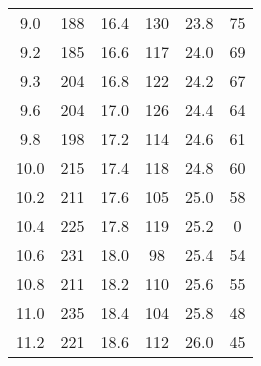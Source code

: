 \begin{table}
\begin{tabular}{S S S S S S }
9.0  & 188  & 16.4  & 130  & 23.8  & 75\\ 
9.2  & 185  & 16.6  & 117  & 24.0  & 69\\ 
9.3  & 204  & 16.8  & 122  & 24.2  & 67\\ 
9.6  & 204  & 17.0  & 126  & 24.4  & 64\\ 
9.8  & 198  & 17.2  & 114  & 24.6  & 61\\ 
10.0  & 215  & 17.4  & 118  & 24.8  & 60\\ 
10.2  & 211  & 17.6  & 105  & 25.0  & 58\\ 
10.4  & 225  & 17.8  & 119  & 25.2  & 0\\ 
10.6  & 231  & 18.0  & 98  & 25.4  & 54\\ 
10.8  & 211  & 18.2  & 110  & 25.6  & 55\\ 
11.0  & 235  & 18.4  & 104  & 25.8  & 48\\ 
11.2  & 221  & 18.6  & 112  & 26.0  & 45\\ 
\bottomrule 
\end{tabular} 
\end{table}